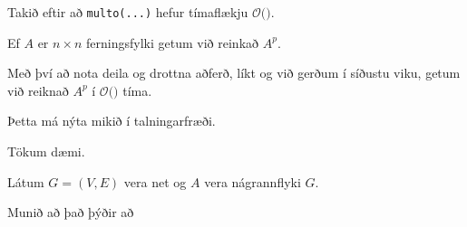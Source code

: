 {
}

{
	{
		\item<1-> Takið eftir að \texttt{multo(...)} hefur tímaflækju $\mathcal{O}($\onslide<2->{$n^3$}$)$.
		\item<3-> Ef $A$ er $n \times n$ ferningsfylki getum við reinkað $A^p$.
		\item<4-> Með því að nota deila og drottna aðferð, líkt og við gerðum í síðustu viku, getum við reiknað $A^p$ í
					$\mathcal{O}($\onslide<5->{$n^3 \log p$}$)$ tíma.
		\item<5-> Þetta má nýta mikið í talningarfræði.
		\item<6-> Tökum dæmi.
	}
}

{
	{
		\item<1-> Látum $G = (V, E)$ vera net og $A$ vera nágrannflyki $G$.
		\item<2-> Munið að það þýðir að 
	}
}

{
}



